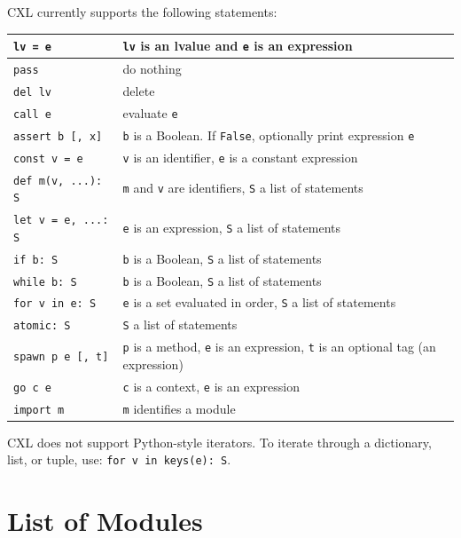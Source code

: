 \documentclass{report}
\begin{document}
CXL currently supports the following statements:

\vspace{1em}
\begin{tabular}{|l|l|}
\hline
\texttt{lv = e} & \texttt{lv} is an lvalue and \texttt{e} is an expression\\
\hline
\texttt{pass} & do nothing\\
\hline
\texttt{del lv} & delete\\
\hline
\texttt{call e} & evaluate \texttt{e}\\
\hline
\texttt{assert b [, x]} & \texttt{b} is a Boolean.  If \texttt{False}, optionally print expression \texttt{e}\\
\hline
\texttt{const v = e} & \texttt{v} is an identifier, \texttt{e} is a constant expression\\
\hline
\texttt{def m(v, ...): S} & \texttt{m} and \texttt{v} are identifiers, \texttt{S} a list of statements\\
\hline
\texttt{let v = e, ...: S} & \texttt{e} is an expression, \texttt{S} a list of statements\\
\hline
\texttt{if b: S} & \texttt{b} is a Boolean, \texttt{S} a list of statements\\
\hline
\texttt{while b: S} & \texttt{b} is a Boolean, \texttt{S} a list of statements\\
\hline
\texttt{for v in e: S} & \texttt{e} is a set evaluated in order,
                            \texttt{S} a list of statements\\
\hline
\texttt{atomic: S} & \texttt{S} a list of statements\\
\hline
\texttt{spawn p e [, t]} & \texttt{p} is a method, \texttt{e} is an expression, \texttt{t} is an optional tag (an expression) \\
\hline
\texttt{go c e} & \texttt{c} is a context, \texttt{e} is an expression \\
\hline
\texttt{import m} & \texttt{m} identifies a module \\
\hline
\end{tabular}
\vspace{1em}

CXL does not support Python-style iterators.
To iterate through a dictionary, list, or tuple, use:
\texttt{for v in keys(e):~S}.

\chapter{List of Modules}
\end{document}
